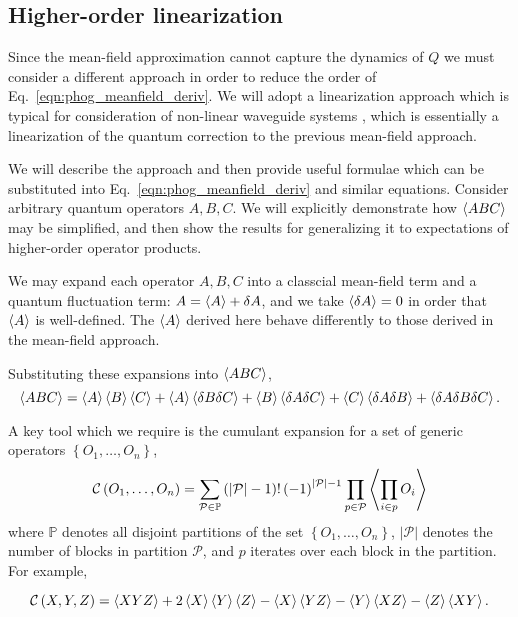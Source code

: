 \subsection{Higher-order linearization}\label{sec:linearization}
Since the mean-field approximation cannot capture the dynamics of $Q$ we must consider a different approach in order to reduce the order of Eq.~\ref{eqn:phog_meanfield_deriv}. We will adopt a linearization approach which is typical for consideration of non-linear waveguide systems , which is essentially a linearization of the quantum correction to the previous mean-field approach. 

We will describe the approach and then provide useful formulae which can be substituted into Eq.~\ref{eqn:phog_meanfield_deriv} and similar equations. Consider arbitrary quantum operators $A, B, C$. We will explicitly demonstrate how $\ev{ABC}$ may be simplified, and then show the results for generalizing it to expectations of higher-order operator products. 

We may expand each operator $A, B, C$ into a classcial mean-field term and a quantum fluctuation term: $A = \ev{A} + \delta A$, and we take $\ev{\delta A} = 0$ in order that $\ev{A}$ is well-defined. The $\ev{A}$ derived here behave differently to those derived in the mean-field approach.

Substituting these expansions into $\ev{A B C}$,
\begin{equation}\label{eqn:phog_linearization_deriv}
\ev{A B C} = \ev{A}\ev{B}\ev{C} + \ev{A}\ev{\delta B \delta C} + \ev{B} \ev{\delta A \delta C} + \ev{C} \ev{\delta A \delta B} + \ev{\delta A \delta B \delta C}.
\end{equation}

A key tool which we require is the cumulant expansion for a set of generic operators $\left\{ O_1, \dots, O_n\right\}$, 
\begin{equation}
\mathcal{C}\left(O_1, \dots, O_n\right) = \sum_{\mathcal{P}\in \mathbb{P}} \left(\left|\mathcal{P}\right| - 1\right)! \left(-1\right)^{\left|\mathcal{P}\right|-1} \prod_{p \in \mathcal{P}} \ev{\prod_{i \in p} O_i}
\end{equation}
where $\mathbb{P}$ denotes all disjoint partitions of the set $\left\{O_1, \dots, O_n\right\}$, $\left| \mathcal{P}\right|$ denotes the number of blocks in partition $\mathcal{P}$, and $p$ iterates over each block in the partition. For example,

\begin{equation}
\mathcal{C} \left(X, Y, Z\right) = \ev{X Y Z} + 2 \ev{X}\ev{Y}\ev{Z} - \ev{X}\ev{Y Z} - \ev{Y}\ev{X Z} - \ev{Z}\ev{X Y}.
\end{equation}

